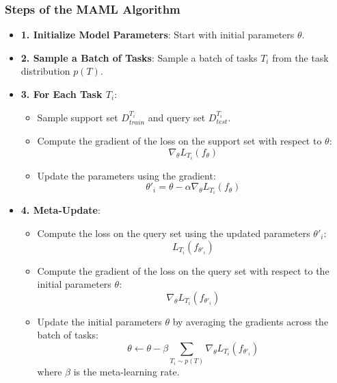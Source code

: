 \documentclass{ieeeojies}
\begin{document}
\subsubsection*{\textbf{Steps of the MAML Algorithm}\cite{b4}}
\begin{itemize}
    \item \textbf{1. Initialize Model Parameters}: Start with initial parameters $\theta$.
    \item \textbf{2. Sample a Batch of Tasks}: Sample a batch of tasks $T_i$ from the task distribution $p(T)$.
    \item \textbf{3. For Each Task $T_i$}:
    \begin{itemize}
        \item Sample support set $D_{train}^{T_i}$ and query set $D_{test}^{T_i}$.
        \item Compute the gradient of the loss on the support set with respect to $\theta$:
        \begin{equation}
        \nabla_{\theta} L_{T_i} (f_{\theta})
        \end{equation}
        \item Update the parameters using the gradient:
        \begin{equation}
        \theta'_i = \theta - \alpha \nabla_{\theta} L_{T_i} (f_{\theta})
        \end{equation}
    \end{itemize}
    \item \textbf{4. Meta-Update}:
    \begin{itemize}
        \item Compute the loss on the query set using the updated parameters $\theta'_i$:
        \begin{equation}
        L_{T_i} (f_{\theta'_i})
        \end{equation}
        \item Compute the gradient of the loss on the query set with respect to the initial parameters $\theta$:
        \begin{equation}
        \nabla_{\theta} L_{T_i} (f_{\theta'_i})
        \end{equation}
        \item Update the initial parameters $\theta$ by averaging the gradients across the batch of tasks:
        \begin{equation}
        \theta \leftarrow \theta - \beta \sum_{T_i \sim p(T)} \nabla_{\theta} L_{T_i} (f_{\theta'_i})
        \end{equation}
        where $\beta$ is the meta-learning rate.
    \end{itemize}
\end{itemize}
\end{document}

